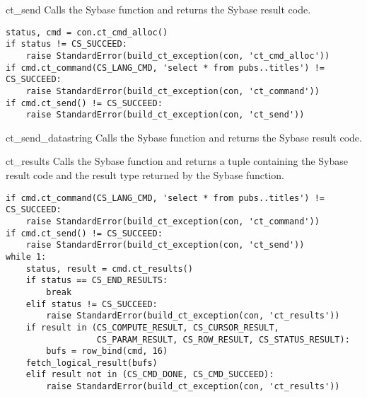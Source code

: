 \begin{methoddesc}[CS_COMMAND]{ct_send}{}
Calls the Sybase  function and returns the Sybase
result code.

\begin{verbatim}
status, cmd = con.ct_cmd_alloc()
if status != CS_SUCCEED:
    raise StandardError(build_ct_exception(con, 'ct_cmd_alloc'))
if cmd.ct_command(CS_LANG_CMD, 'select * from pubs..titles') != CS_SUCCEED:
    raise StandardError(build_ct_exception(con, 'ct_command'))
if cmd.ct_send() != CS_SUCCEED:
    raise StandardError(build_ct_exception(con, 'ct_send'))
\end{verbatim}
\end{methoddesc}

\begin{methoddesc}[CS_COMMAND]{ct_send_data}{string}
Calls the Sybase  function and returns the
Sybase result code.
\end{methoddesc}

\begin{methoddesc}[CS_COMMAND]{ct_results}{}
Calls the Sybase  function and returns a tuple
containing the Sybase result code and the result type returned by the
Sybase function.

\begin{verbatim}
if cmd.ct_command(CS_LANG_CMD, 'select * from pubs..titles') != CS_SUCCEED:
    raise StandardError(build_ct_exception(con, 'ct_command'))
if cmd.ct_send() != CS_SUCCEED:
    raise StandardError(build_ct_exception(con, 'ct_send'))
while 1:
    status, result = cmd.ct_results()
    if status == CS_END_RESULTS:
        break
    elif status != CS_SUCCEED:
        raise StandardError(build_ct_exception(con, 'ct_results'))
    if result in (CS_COMPUTE_RESULT, CS_CURSOR_RESULT,
                  CS_PARAM_RESULT, CS_ROW_RESULT, CS_STATUS_RESULT):
        bufs = row_bind(cmd, 16)
	fetch_logical_result(bufs)
    elif result not in (CS_CMD_DONE, CS_CMD_SUCCEED):
        raise StandardError(build_ct_exception(con, 'ct_results'))
\end{verbatim}
\end{methoddesc}

